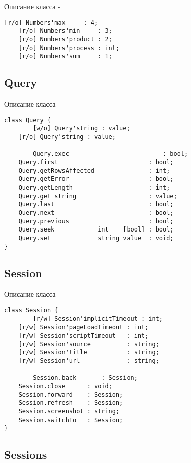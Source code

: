 \noindent Описание класса  -
\begin{lstlisting}[numbers=none]
        [r/o] Numbers'max     : 4;
	[r/o] Numbers'min     : 3;
	[r/o] Numbers'product : 2;
	[r/o] Numbers'process : int;
	[r/o] Numbers'sum     : 1;
\end{lstlisting}

\subsection{{\color{orange} Query}}

\noindent Описание класса  -
\begin{lstlisting}[numbers=none]
class Query {
        [w/o] Query'string : value;
	[r/o] Query'string : value;
	
        Query.exec                          : bool;
	Query.first                         : bool;
	Query.getRowsAffected               : int;
	Query.getError                      : bool;
	Query.getLength                     : int;
	Query.get string                    : value;
	Query.last                          : bool;
	Query.next                          : bool;
	Query.previous                      : bool;
	Query.seek            int    [bool] : bool;
	Query.set             string value  : void;
}
\end{lstlisting}

\subsection{{\color{orange} Session}}

\noindent Описание класса  -
\begin{lstlisting}[numbers=none]
class Session {
        [r/w] Session'implicitTimeout : int;
	[r/w] Session'pageLoadTimeout : int;
	[r/w] Session'scriptTimeout   : int;
	[r/w] Session'source          : string;
	[r/w] Session'title           : string;
	[r/w] Session'url             : string;
	
        Session.back       : Session;
	Session.close      : void;
	Session.forward    : Session;
	Session.refresh    : Session;
	Session.screenshot : string;
	Session.switchTo   : Session;
}
\end{lstlisting}

\subsection{{\color{orange} Sessions}}

